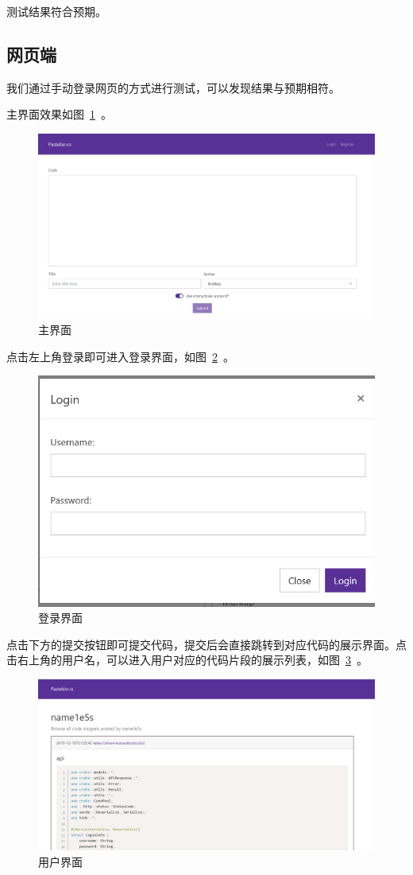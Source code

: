 \documentclass[ichigo,normal,cn]{elegantnote}
\begin{document}
测试结果符合预期。

\subsection{网页端}
我们通过手动登录网页的方式进行测试，可以发现结果与预期相符。

主界面效果如图~\ref{fig:main}~。

\begin{figure}[!htbp]
    \centering
    \includegraphics[width=.8\textwidth]{main}
    \caption{主界面}
    \label{fig:main}
\end{figure}

点击左上角登录即可进入登录界面，如图~\ref{fig:login}~。

\begin{figure}[!htbp]
    \centering
    \includegraphics[width=.5\textwidth]{login}
    \caption{登录界面}
    \label{fig:login}
\end{figure}

点击下方的提交按钮即可提交代码，提交后会直接跳转到对应代码的展示界面。点击右上角的用户名，可以进入用户对应的代码片段的展示列表，如图~\ref{fig:user}~。

\begin{figure}[!htbp]
    \centering
    \includegraphics[width=.8\textwidth]{user}
    \caption{用户界面}
    \label{fig:user}
\end{figure}
\end{document}
